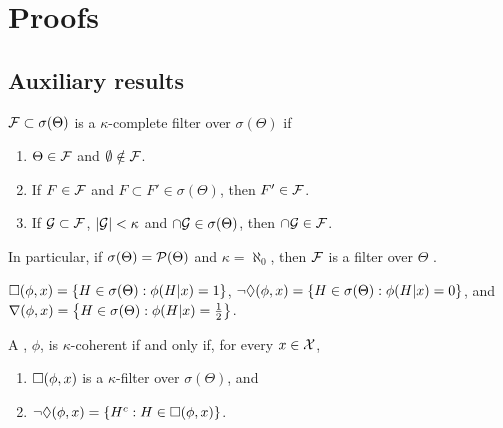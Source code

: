 \section{Proofs}

\subsection{Auxiliary results}

\begin{definition}
 \label{def:filter}
 $\mathcal{F} \subset \sigma(\Theta)$ is a 
 $\kappa$-complete filter over $\sigma(\Theta)$ if
 \begin{enumerate}
  \item $\Theta \in \mathcal{F}$ and $\emptyset \notin \mathcal{F}$.
	\item If $F \in \mathcal{F}$ and $F \subset F' \in \sigma(\Theta)$, 
	      then $F' \in \mathcal{F}$.
	\item If $\mathcal{G} \subset \mathcal{F}$, $|\mathcal{G}| < \kappa$ and 
	      $\cap \mathcal{G} \in \sigma(\Theta)$,
	      then $\cap \mathcal{G} \in \mathcal{F}$.
 \end{enumerate}
 In particular, if $\sigma(\Theta)=\mathcal{P}(\Theta)$ and 
 $\kappa=\aleph_0$, then 
 $\mathcal{F}$ is a filter over $\Theta$ \citep{Jech2013}.
\end{definition}

\begin{definition}
 $\square({\phi,x}) = \{H \in \sigma(\Theta): \phi(H|x) = 1\}$,
 $\lnot \Diamond({\phi,x}) = \{H \in \sigma(\Theta): \phi(H|x) = 0\}$, and
 $\nabla({\phi,x}) = \left\{H \in \sigma(\Theta): \phi(H|x) = \frac{1}{2}\right\}$.
\end{definition}

\begin{lemma}
 \label{thm:coherence-filter}
 A \summ, $\phi$, is 
 $\kappa$-coherent if and only if,
 for every $x \in \mathcal{X}$,
 \begin{enumerate}
  \item $\square({\phi,x})$ is a $\kappa$-filter 
  over $\sigma(\Theta)$, and
  \item $\lnot \Diamond({\phi,x}) = \{H^{c}: H \in \square({\phi,x})\}$.
 \end{enumerate}
\end{lemma}

